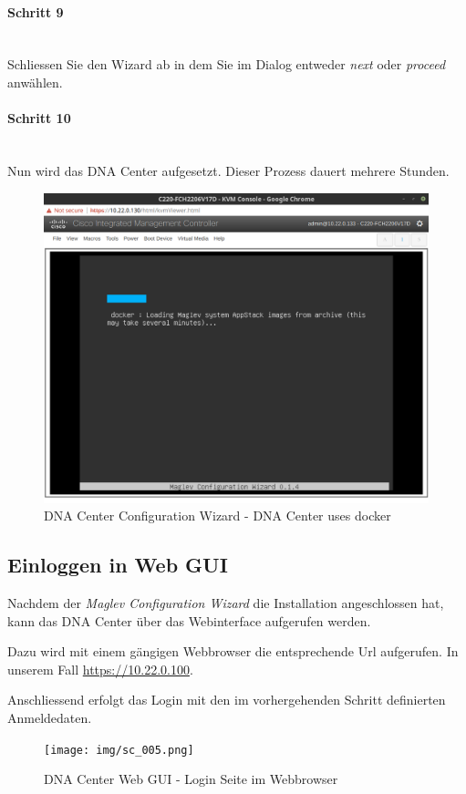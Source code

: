 \paragraph{Schritt 9}
~\\
Schliessen Sie den Wizard ab in dem Sie im Dialog entweder \textit{next} oder \textit{proceed} anwählen.

\paragraph{Schritt 10}
~\\
Nun wird das DNA Center aufgesetzt. Dieser Prozess dauert mehrere Stunden. 

\begin{figure}[H]
	\centering
	\includegraphics[height=9cm]{img/sc_004.png}
	\caption{DNA Center Configuration Wizard - DNA Center uses docker}
	\label{fig:dna-center-install-step-install}
\end{figure}

\subsection{Einloggen in Web GUI}
Nachdem der \textit{Maglev Configuration Wizard} die Installation angeschlossen hat, kann das DNA Center über das Webinterface aufgerufen werden.

Dazu wird mit einem gängigen Webbrowser die entsprechende Url aufgerufen. In unserem Fall \url{https://10.22.0.100}.

Anschliessend erfolgt das Login mit den im vorhergehenden Schritt definierten Anmeldedaten. 

\begin{figure}[H]
	\centering
	\texttt{[image: img/sc\_005.png]}
	\caption{DNA Center Web GUI - Login Seite im Webbrowser}
	\label{fig:installguide-dna-center-gui-1}
\end{figure}

